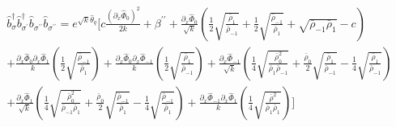 \scriptsize
\begin{align}
\hat{b}_{\sigma}^{\dagger}\hat{b}_{\sigma^\prime}^{\dagger} \hat{b}_{\sigma^{\prime \prime}}^{} \hat{b}_{\sigma^{\prime \prime}}^{}  =  e^{\sqrt{k}\hat{\theta}_{q}} \Big[  c \frac{(\partial_ x\hat{\Phi}_{0})^2}{2k} + \beta^{ \prime \prime} + \frac{\partial_x \hat{\Phi}_{0}}{\sqrt{k}} \left(\frac{1}{2}  \sqrt{\frac{\bar{\rho}_{1}}{\bar{\rho}_{-1}}} + \frac{1}{2} \sqrt{\frac{\bar{\rho}_{-1}}{\bar{\rho}_{1}}} + \sqrt{\bar{\rho}_{-1} \bar{\rho}_1} -c\right) & \nonumber \\
 + \frac{\partial_x \hat{\Phi}_{0}\partial_{x} \hat{\Phi}_{1} }{k} \left(\frac{1}{2} \sqrt{\frac{\bar{\rho}_{-1}}{\bar{\rho}_{1}}} \right)
 + \frac{\partial_x \hat{\Phi}_{0}\partial_{x} \hat{\Phi}_{-1} }{k} \left(\frac{1}{2} \sqrt{\frac{\bar{\rho}_{1}}{\bar{\rho}_{-1}}} \right) +\frac{\partial_x \hat{\Phi}_{-1}}{\sqrt{k}} \left(\frac{1}{4} \sqrt{\frac{\bar{\rho}_{0}^{2}}{\bar{\rho}_{1}\bar{\rho}_{-1}}}  + \frac{\bar{\rho}_{0}}{2}  \sqrt{\frac{\bar{\rho}_{1}}{\bar{\rho}_{-1}}} - \frac{1}{4} \sqrt{\frac{\bar{\rho}_{1}}{\bar{\rho}_{-1}}} \right) \nonumber\\ 
+\frac{\partial_x \hat{\Phi}_{1}}{\sqrt{k}} \left(\frac{1}{4} \sqrt{\frac{\bar{\rho}_{0}^{2}}{\bar{\rho}_{-1}\bar{\rho}_{1}}}  + \frac{\bar{\rho}_{0}}{2}  \sqrt{\frac{\bar{\rho}_{-1}}{\bar{\rho}_{1}}} - \frac{1}{4} \sqrt{\frac{\bar{\rho}_{-1}}{\bar{\rho}_{1}}} \right)   +\frac{\partial_x \hat{\Phi}_{-1} \partial_x \hat{\Phi}_{1}}{k}\left(\frac{1}{4} \sqrt{\frac{\bar{\rho}^2}{\bar{\rho}_{1} \bar{\rho}_{1}}} \right) \Big]\nonumber &  
\end{align}



